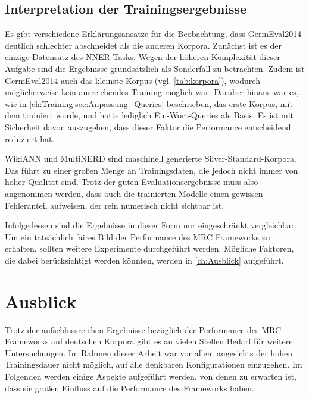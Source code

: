 \section{Interpretation der Trainingsergebnisse}
\label{ch:Evaluation:sec:Interpretation_der_Trainingsergebnisse}

Es gibt verschiedene Erklärungsansätze für die Beobachtung, dass GermEval2014 deutlich schlechter abschneidet als die anderen Korpora. Zunächst ist es der einzige Datensatz des NNER-Tasks. Wegen der höheren Komplexität dieser Aufgabe sind die Ergebnisse grundsätzlich als Sonderfall zu betrachten. Zudem ist GermEval2014 auch das kleinste Korpus (vgl. \autoref{tab:korpora}), wodurch möglicherweise kein ausreichendes Training möglich war. Darüber hinaus war es, wie in \autoref{ch:Training:sec:Anpassung_Queries} beschrieben, das erste Korpus, mit dem trainiert wurde, und hatte lediglich Ein-Wort-Queries als Basis. Es ist mit Sicherheit davon auszugehen, dass dieser Faktor die Performance entscheidend reduziert hat.

WikiANN und MultiNERD sind maschinell generierte Silver-Standard-Korpora. Das führt zu einer großen Menge an Trainingsdaten, die jedoch nicht immer von hoher Qualität sind. Trotz der guten Evaluationsergebnisse muss also angenommen werden, dass auch die trainierten Modelle einen gewissen Fehleranteil aufweisen, der rein numerisch nicht sichtbar ist.

Infolgedessen sind die Ergebnisse in dieser Form nur eingeschränkt vergleichbar. Um ein tatsächlich faires Bild der Performance des MRC Frameworks zu erhalten, sollten weitere Experimente durchgeführt werden. Mögliche Faktoren, die dabei berücksichtigt werden könnten, werden in \autoref{ch:Ausblick} aufgeführt.

\chapter{Ausblick}
\label{ch:Ausblick}

Trotz der aufschlussreichen Ergebnisse bezüglich der Performance des MRC Frameworks auf deutschen Korpora gibt es an vielen Stellen Bedarf für weitere Untersuchungen. Im Rahmen dieser Arbeit war vor allem angesichts der hohen Trainingsdauer nicht möglich, auf alle denkbaren Konfigurationen einzugehen. Im Folgenden werden einige Aspekte aufgeführt werden, von denen zu erwarten ist, dass sie großen Einfluss auf die Performance des Frameworks haben.

